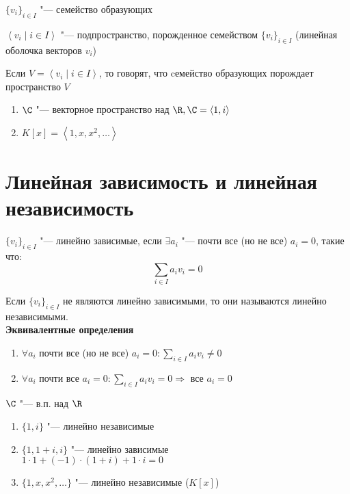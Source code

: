 \begin{Def}
	$\{ v_i \}_{i \in I}$ "--- семейство образующих 
\end{Def}

\begin{Def}
	$\left< v_i \mid i \in I \right>$ "--- подпространство, порожденное семейством $\{ v_i \}_{i \in I}$ (линейная оболочка векторов $v_i$)
\end{Def}

\begin{Def}
	Если $V = \left< v_i \mid i \in I \right>$, то говорят, что cемейство образующих порождает пространство $V$
\end{Def}

\begin{exmp}

	\begin{enumerate}
	\item
		$\C$ "--- векторное пространство над $\R, \C = \left< 1, i \right>$
	\item
		$K[x] = \left< 1, x, x^2, \dots \right>$
	\end{enumerate}
\end{exmp}

\section{Линейная зависимость и линейная независимость}

\begin{Def}
	$\{ v_i \}_{i \in I}$ "--- линейно зависимые, если $\exists a_i$ "--- почти все (но не все) $a_i = 0$, такие что:
	\[\sum_{i \in I} a_iv_i = 0\]
\end{Def}

\begin{Def}
	Если $\{ v_i \}_{i \in I}$ не являются линейно зависимыми, то они называются линейно независимыми. \\
	\textbf{Эквивалентные определения}
	\begin{enumerate}
	\item
		$\forall a_i$ почти все (но не все) $a_i = 0 \colon \sum\limits_{i \in I} a_iv_i \neq 0$
	\item
		$\forall a_i$ почти все $a_i = 0 \colon \sum\limits_{i \in I} a_iv_i = 0 \Rightarrow$ все $a_i = 0$
	\end{enumerate}
\end{Def}

\begin{exmp}

	$\C$ "--- в.п. над $\R$
	\begin{enumerate}
	\item
		$\{1, i\}$ "--- линейно независимые
	\item
		$\{1, 1 + i, i\}$ "--- линейно зависимые \\
		$1 \cdot 1 + (-1) \cdot (1 + i) + 1 \cdot i = 0$
	\item
		$\{1, x, x^2, \dots\}$ "--- линейно независимые ($K[x]$)
	\end{enumerate}
\end{exmp}

